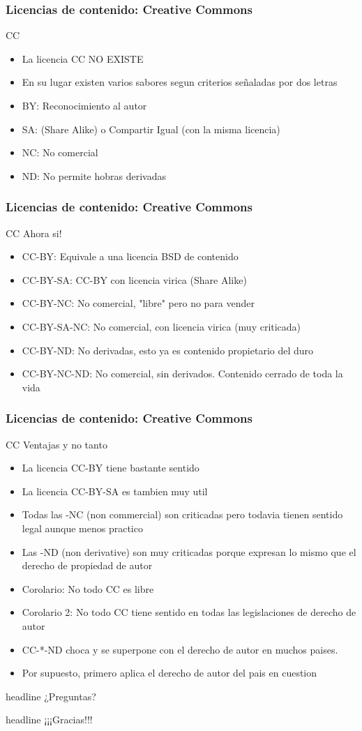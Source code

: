 \documentclass[11pt]{beamer}
\newcommand{\question}[1]
{
\begin{beamercolorbox}[sep=1mm, rounded=true, shadow=true]{headline}
#1
\end{beamercolorbox}
}
\begin{document}
\begin{frame}
\frametitle{Licencias de contenido: Creative Commons}
\begin{block}{CC}
\begin{itemize}[<+->]
\item La licencia CC \alert{NO EXISTE}
\item En su lugar existen varios sabores segun criterios señaladas por dos letras
\item BY: Reconocimiento al autor
\item SA: (Share Alike) o Compartir Igual (con la misma licencia)
\item NC: No comercial
\item ND: No permite hobras derivadas
\end{itemize}
\end{block}
\end{frame}

\begin{frame}
\frametitle{Licencias de contenido: Creative Commons}
\begin{block}{CC Ahora si!}
\begin{itemize}[<+->]
\item CC-BY: Equivale a una licencia BSD de contenido
\item CC-BY-SA: CC-BY con licencia virica (Share Alike)
\item CC-BY-NC: No comercial, "libre" pero no para vender
\item CC-BY-SA-NC: No comercial, con licencia virica (muy criticada)
\item CC-BY-ND: No derivadas, esto ya es contenido propietario del duro
\item CC-BY-NC-ND: No comercial, sin derivados. Contenido cerrado de toda la vida
\end{itemize}
\end{block}
\end{frame}

\begin{frame}
\frametitle{Licencias de contenido: Creative Commons}
\begin{block}{CC Ventajas y no tanto}
\begin{itemize}[<+->]
\item La licencia CC-BY tiene bastante sentido
\item La licencia CC-BY-SA es tambien muy util
\item Todas las -NC (non commercial) son criticadas pero todavia tienen sentido legal aunque menos practico
\item Las -ND (non derivative) son muy criticadas porque expresan lo mismo que el derecho de propiedad de autor
\item Corolario: No todo CC es libre
\item Corolario 2: No todo CC tiene sentido en todas las legislaciones de derecho de autor
\item CC-*-ND choca y se superpone con el derecho de autor en muchos paises.
\item Por supuesto, primero aplica el derecho de autor del pais en cuestion
\end{itemize}
\end{block}
\end{frame}

\begin{frame}
\question{¿Preguntas?}
\end{frame}

\begin{frame}
\question{¡¡¡Gracias!!!}
\end{frame}
\end{document}

